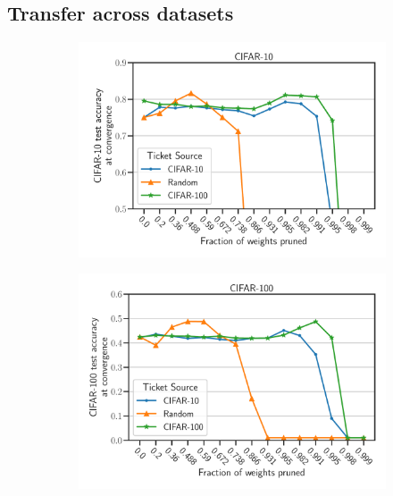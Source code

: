     \subsection{Transfer across datasets}
        \begin{figure}[h]
            \begin{subfigure}[b]{0.45\textwidth}
                    \includegraphics[width=\linewidth]{../openreview/plots/Exp2_ResNet_CIFAR10_N.pdf}
            \end{subfigure}
            \begin{subfigure}[b]{0.45\textwidth}
                    \includegraphics[width=\linewidth]{../openreview/plots/Exp2_ResNet_CIFAR100_N.pdf}
            \end{subfigure}
            \begin{subfigure}[b]{0.45\textwidth}

\end{subfigure}
\end{figure}
